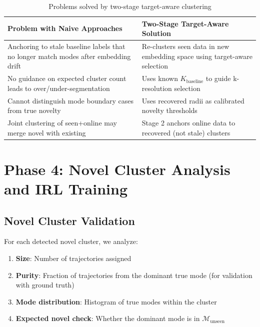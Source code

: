 \documentclass{article}
\begin{document}
\begin{table}[h]
\centering
\begin{tabular}{p{5.5cm}p{6.5cm}}
\toprule
\textbf{Problem with Naive Approaches} & \textbf{Two-Stage Target-Aware Solution} \\
\midrule
Anchoring to stale baseline labels that no longer match modes after embedding drift & Re-clusters seen data in new embedding space using target-aware selection \\
No guidance on expected cluster count leads to over/under-segmentation & Uses known $K_{\text{baseline}}$ to guide k-resolution selection \\
Cannot distinguish mode boundary cases from true novelty & Uses recovered radii as calibrated novelty thresholds \\
Joint clustering of seen+online may merge novel with existing & Stage 2 anchors online data to recovered (not stale) clusters \\
\bottomrule
\end{tabular}
\caption{Problems solved by two-stage target-aware clustering}
\end{table}

\section{Phase 4: Novel Cluster Analysis and IRL Training}

\subsection{Novel Cluster Validation}

For each detected novel cluster, we analyze:

\begin{enumerate}
    \item \textbf{Size}: Number of trajectories assigned
    \item \textbf{Purity}: Fraction of trajectories from the dominant true mode (for validation with ground truth)
    \item \textbf{Mode distribution}: Histogram of true modes within the cluster
    \item \textbf{Expected novel check}: Whether the dominant mode is in $\mathcal{M}_{\text{unseen}}$
\end{enumerate}
\end{document}
